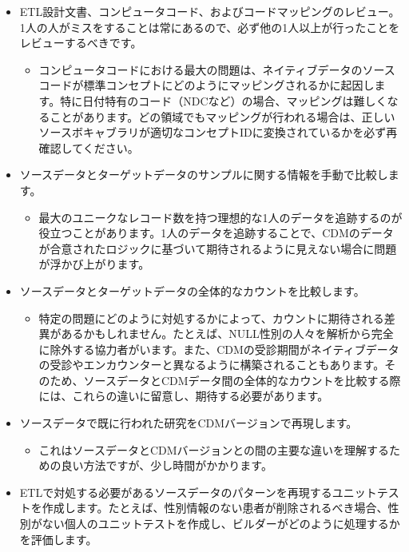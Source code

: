 \documentclass[
  11pt]{book}
\providecommand{\tightlist}{%
  \setlength{\itemsep}{0pt}\setlength{\parskip}{0pt}}
\theoremstyle{definition}
\theoremstyle{definition}
\theoremstyle{definition}
\theoremstyle{definition}
\theoremstyle{remark}
\begin{document}
\begin{itemize}
\tightlist
\item
  ETL設計文書、コンピュータコード、およびコードマッピングのレビュー。1人の人がミスをすることは常にあるので、必ず他の1人以上が行ったことをレビューするべきです。

  \begin{itemize}
  \tightlist
  \item
    コンピュータコードにおける最大の問題は、ネイティブデータのソースコードが標準コンセプトにどのようにマッピングされるかに起因します。特に日付特有のコード（NDCなど）の場合、マッピングは難しくなることがあります。どの領域でもマッピングが行われる場合は、正しいソースボキャブラリが適切なコンセプトIDに変換されているかを必ず再確認してください。
  \end{itemize}
\item
  ソースデータとターゲットデータのサンプルに関する情報を手動で比較します。

  \begin{itemize}
  \tightlist
  \item
    最大のユニークなレコード数を持つ理想的な1人のデータを追跡するのが役立つことがあります。1人のデータを追跡することで、CDMのデータが合意されたロジックに基づいて期待されるように見えない場合に問題が浮かび上がります。
  \end{itemize}
\item
  ソースデータとターゲットデータの全体的なカウントを比較します。

  \begin{itemize}
  \tightlist
  \item
    特定の問題にどのように対処するかによって、カウントに期待される差異があるかもしれません。たとえば、NULL性別の人々を解析から完全に除外する協力者がいます。また、CDMの受診期間がネイティブデータの受診やエンカウンターと異なるように構築されることもあります。そのため、ソースデータとCDMデータ間の全体的なカウントを比較する際には、これらの違いに留意し、期待する必要があります。
  \end{itemize}
\item
  ソースデータで既に行われた研究をCDMバージョンで再現します。

  \begin{itemize}
  \tightlist
  \item
    これはソースデータとCDMバージョンとの間の主要な違いを理解するための良い方法ですが、少し時間がかかります。
  \end{itemize}
\item
  ETLで対処する必要があるソースデータのパターンを再現するユニットテストを作成します。たとえば、性別情報のない患者が削除されるべき場合、性別がない個人のユニットテストを作成し、ビルダーがどのように処理するかを評価します。


\end{itemize}
\end{document}
